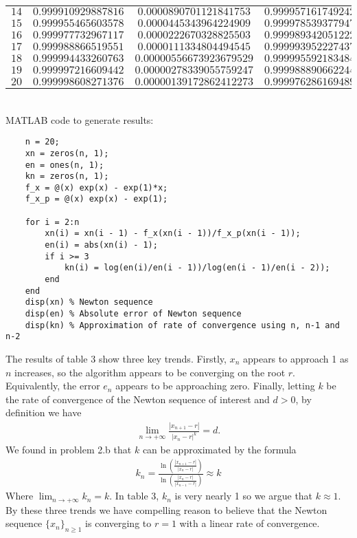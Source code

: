\documentclass[11pt, letterpaper]{article}
\begin{document}
\begin{table}[h!]
\begin{center}
\begin{tabular}{c|c|c|c}
            $14$ & $0.999910929887816$ & $0.0000890701121841753$ & $0.999957161749242$\\
            $15$ & $0.999955465603578$ & $0.0000445343964224909$ & $0.999978539377947$\\
            $16$ & $0.999977732967117$ & $0.0000222670328825503$ & $0.999989342051222$\\
            $17$ & $0.999988866519551$ & $0.0000111334804494545$ & $0.999993952227437$\\
            $18$ & $0.999994433260763$ & $0.00000556673923679529$ & $0.999995592183484$\\
            $19$ & $0.999997216609442$ & $0.00000278339055759247$ & $0.999988890662244$\\
            $20$ & $0.999998608271376$ & $0.00000139172862412273$ & $0.999976286169489$
        \end{tabular}
    \end{center}
\end{table}\\
MATLAB code to generate results:
\begin{verbatim}
    n = 20;
    xn = zeros(n, 1);
    en = ones(n, 1);
    kn = zeros(n, 1);
    f_x = @(x) exp(x) - exp(1)*x;
    f_x_p = @(x) exp(x) - exp(1);

    for i = 2:n
        xn(i) = xn(i - 1) - f_x(xn(i - 1))/f_x_p(xn(i - 1));
        en(i) = abs(xn(i) - 1);
        if i >= 3
            kn(i) = log(en(i)/en(i - 1))/log(en(i - 1)/en(i - 2));
        end
    end
    disp(xn) % Newton sequence
    disp(en) % Absolute error of Newton sequence
    disp(kn) % Approximation of rate of convergence using n, n-1 and n-2
\end{verbatim}
The results of table 3 show three key trends. Firstly, $x_n$ appears to approach 1 as $n$ increases, so 
the algorithm appears to be converging on the root $r$. Equivalently, the error $e_n$ appears to be approaching zero.
Finally, letting $k$ be the rate of convergence of the Newton sequence of interest and $d>0$, by definition we have
\begin{align*}
    \lim_{n\to +\infty}\frac{|x_{n+1}-r|}{|x_{n}-r|^k}=d.
\end{align*}
We found in problem 2.b that $k$ can be approximated by the formula
\begin{align*}
    k_n=\frac{\ln\left(\frac{|x_{n+1}-r|}{|x_n-r|}\right)}{\ln\left(\frac{|x_n-r|}{|x_{n-1}-r|}\right)}\approx k
\end{align*}
Where $\lim_{n\to +\infty}k_n=k$. In table 3, $k_n$ is very nearly 1 so we argue that $k\approx 1$. By these three
trends we have compelling reason to believe that the Newton sequence $\{x_n\}_{n\geq 1}$ is converging
to $r=1$ with a linear rate of convergence.
\end{document}
